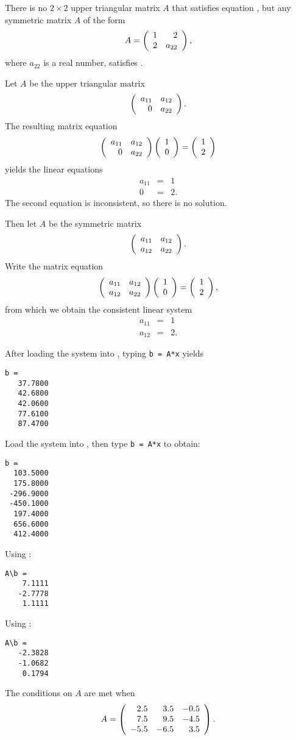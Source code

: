 \documentclass{ximera}
\begin{document}
\ans There is no $2 \times 2$ upper triangular matrix $A$ that
satisfies equation , but any symmetric matrix $A$ of the form
\[ A = \left(\begin{array}{rr} 1 & 2\\ 2 &a_{22}\end{array}\right), \]
where $a_{22}$ is a real number, satisfies .

\soln Let $A$ be the upper triangular matrix
\[ \left(\begin{array}{rr} a_{11} & a_{12}\\ 0 &a_{22}\end{array}\right). \]
The resulting matrix equation
\[ \left(\begin{array}{rr} a_{11} & a_{12}\\ 0 &a_{22}\end{array}\right)
\left(\begin{array}{r} 1 \\ 0\end{array}\right) = \left(\begin{array}{r} 1 \\ 2\end{array}\right) \]
yields the linear equations
\[ \begin{array}{rcl}
a_{11} & = & 1 \\
0 & = & 2.\end{array} \]
The second equation is inconsistent, so there is no solution.

\para Then let $A$ be the symmetric matrix
\[ \left(\begin{array}{rr} a_{11} & a_{12}\\ a_{12} &a_{22}\end{array}\right). \]
Write the matrix equation
\[ \left(\begin{array}{rr} a_{11} & a_{12}\\ a_{12} &a_{22}\end{array}\right)
\left(\begin{array}{r} 1 \\ 0\end{array}\right) = \left(\begin{array}{r} 1 \\ 2\end{array}\right), \]
from which we obtain the consistent linear system
\[ \begin{array}{rcl}
a_{11} & = & 1 \\
a_{12} & = & 2.\end{array} \]

 After loading the system into \Matlabp, typing
{\tt b = A*x} yields
\begin{verbatim}
b =
   37.7800
   42.6800
   42.0600
   77.6100
   87.4700
\end{verbatim}

 Load the system into \Matlabp, then type {\tt b = A*x}
to obtain:
\begin{verbatim}
b =
  103.5000
  175.8000
 -296.9000
 -450.1000
  197.4000
  656.6000
  412.4000
\end{verbatim}

 Using \Matlabp:
\begin{verbatim}
A\b =
    7.1111
   -2.7778
    1.1111
\end{verbatim}

 Using \Matlabp:
\begin{verbatim}
A\b =
   -2.3828
   -1.0682
    0.1794
\end{verbatim}

\ans The conditions on $A$ are met when
\[ A = \left(\begin{array}{rrr} 2.5 & 3.5 & -0.5 \\ 7.5 & 9.5 & -4.5 \\ -5.5 & -6.5 & 3.5\end{array}\right). \]
\end{document}
